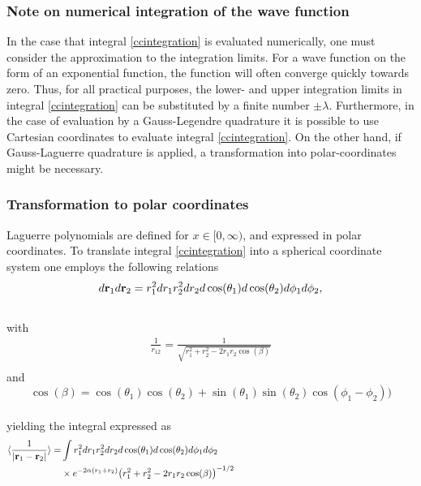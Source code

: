 \documentclass[%
reprint,
amsmath,amssymb,
aps,
]{revtex4-1}
\begin{document}
\subsubsection{Note on numerical integration of the wave function} \noindent 
In the case that integral \ref{ccintegration} is evaluated numerically, one must consider the approximation to the integration limits. For a wave function on the form of an exponential function, the function will often converge quickly towards zero. Thus, for all practical purposes, the lower- and upper integration limits in integral \ref{ccintegration} can be substituted by a finite number $\pm \lambda$. Furthermore, in the case of evaluation by a Gauss-Legendre quadrature it is possible to use Cartesian coordinates to evaluate integral \ref{ccintegration}. On the other hand, if Gauss-Laguerre quadrature is applied, a transformation into polar-coordinates might be necessary.
\subsubsection{Transformation to polar coordinates}  \noindent 
Laguerre polynomials are defined for $x\in[0,\infty)$, and expressed in polar coordinates. To translate integral \ref{ccintegration} into a spherical coordinate system one employs the following relations\vspace{2mm} \\
\begin{equation}\label{r1r2}
	d{\bf r}_1d{\bf r}_2  = r_1^2dr_1 r_2^2dr_2 d\cos(\theta_1)d\cos(\theta_2)d\phi_1d\phi_2,
\end{equation}\vspace{2mm}\\
with \vspace{2mm}\\
\begin{align}\label{r12}
	\frac{1}{r_{12}}= \frac{1}{\sqrt{r_1^2+r_2^2-2r_1r_2\cos(\beta)}} \nonumber \\
\end{align} \vspace{2mm}
and \vspace{2mm}\\
\begin{equation*}
	\cos(\beta) = \cos(\theta_1)\cos(\theta_2)+\sin(\theta_1)\sin(\theta_2)\cos(\phi_1-\phi_2))
\end{equation*}\vspace{2mm}\\
yielding the integral expressed as \vspace{2mm} \\
\begin{align}\label{cpintegration}
	\langle \frac{1}{\abs{{\bf r}_1-{\bf r}_2}} \rangle = &\int r_1^2dr_1 r_2^2dr_2 d\cos(\theta_1)d\cos(\theta_2)d\phi_1d\phi_2  \nonumber \hspace{73mm}  \\ 
	&\times e^{-2\alpha (r_1+r_2)}\qty(r_1^2+r_2^2-2r_1r_2\cos(\beta))^{-1/2} \nonumber  \hspace{35mm} \\ &\nonumber \\
\end{align}
\end{document}
